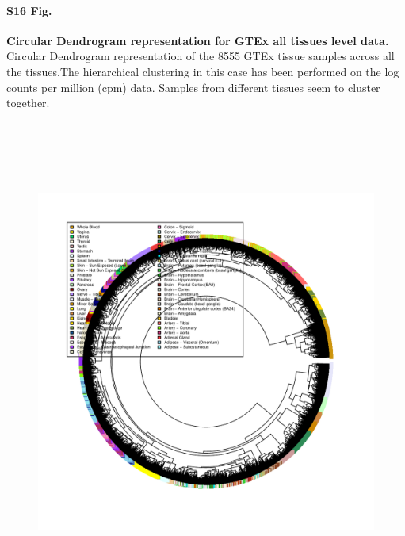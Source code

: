\documentclass[10pt,letterpaper]{article}
\begin{document}
\paragraph*{S16 Fig.}

\label{figS16}
{\bf Circular Dendrogram representation for GTEx all tissues level data.} Circular Dendrogram representation of the 8555 GTEx tissue samples across all the tissues.The hierarchical clustering in this case has been performed on the log counts per million (cpm) data. Samples from different tissues seem to cluster together.
\begin{figure}[ht]
\centering
\includegraphics[height=6.3in, width=6in]{../../plots/dendextend_gtex_circle.pdf}
\end{figure}
\end{document}
